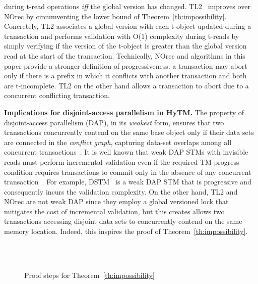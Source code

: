 during t-read operations \emph{iff} the global version has changed.
TL2~\cite{DSS06} improves over NOrec by circumventing the lower bound
of Theorem~\ref{th:impossibility}. Concretely, TL2 associates a global version with each t-object updated during
a transaction and performs validation with O(1) complexity during t-reads by simply verifying if the version
of the t-object is greater than the global version read at the start of the transaction. Technically,
NOrec and algorithms in this paper provide a stronger definition of progressiveness: a transaction may abort
only if there is a prefix in which it conflicts with another transaction and both are t-incomplete. TL2 on the other hand allows
a transaction to abort due to a concurrent conflicting transaction.

\vspace{1mm}\noindent\textbf{Implications for disjoint-access parallelism in HyTM.}
The property of disjoint-access parallelism (DAP), in its \emph{weakest} form, ensures that two transactions %
concurrently contend on the same base object 
only if their data 
sets are connected in the \emph{conflict graph}, capturing 
data-set overlaps among all concurrent transactions~\cite{AHM09}. It is well known that weak DAP STMs with invisible reads must perform incremental validation even if the required TM-progress condition requires
transactions to commit only in the absence of any concurrent transaction~\cite{tm-book,prog15-pact}. For example, DSTM~\cite{HLM+03} is a weak DAP STM that is progressive and consequently incurs the validation
complexity. On the other hand, TL2 and NOrec are not weak DAP since they employ a global versioned lock that mitigates the cost of incremental validation, but this creates allows two transactions accessing
disjoint data sets to concurrently contend on the same memory location. Indeed, this inspires the proof of Theorem~\ref{th:impossibility}. 
\begin{figure*}[!t]
\begin{center}
        \\
        \vspace{1mm}
	\\
	\vspace{1mm}
	\caption{Proof steps for Theorem~\ref{th:impossibility}
        \label{fig:indis}} 
\end{center}
\end{figure*}
